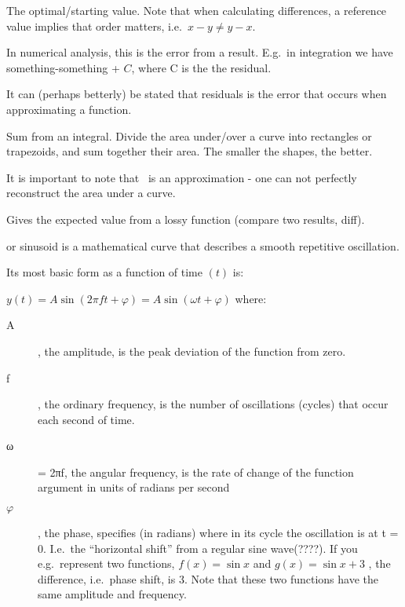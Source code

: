 \begin{definition}[Flow]
\begin{definition}
    The optimal/starting value. Note that when calculating differences,
    a reference value implies that order matters, i.e.\ $x - y \neq y - x$.

\end{definition}

\begin{definition}[Residual]
    In numerical analysis, this is the error from a result.
    E.g.\ in integration we have something-something + $C$, where C is the 
    the residual.

    It can (perhaps betterly) be stated that residuals is the error that occurs
    when approximating a function.

\end{definition}

\begin{definition}\label{riemannsum}
    Sum from an integral. Divide the area under/over a curve into rectangles
    or trapezoids, and sum together their area. The smaller the shapes, the
    better.

    It is important to note that~ is an approximation - 
    one can not perfectly reconstruct the area under a curve.
\end{definition}

\begin{definition}
    Gives the expected value from a lossy function (compare two results, diff).
\end{definition}

\begin{definition}
or sinusoid is a mathematical curve that describes a smooth repetitive
oscillation.

Its most basic form as a function of time $(t)$ is:

$y(t) = A\sin(2 \pi f t + \varphi) = A\sin(\omega t + \varphi)$
where:
\begin{description}
    \item[A], the amplitude, is the peak deviation of the function from zero.
    \item[f], the ordinary frequency, is the number of oscillations (cycles)
        that occur each second of time.
    \item[ω] = 2πf, the angular frequency, is the rate of change of the
    function argument in units of radians per second 
    \item[$\varphi$], the phase, specifies (in radians) where in its cycle the
        oscillation is at t = 0. I.e.\ the ``horizontal shift'' from a regular
        sine wave(????).
    If you e.g.\ represent two functions, $f(x) = \sin{x}$ and $g(x) = \sin{x} + 3$
    , the difference, i.e.\ phase shift, is 3. Note that these two functions
    have the same amplitude and frequency.
\end{description}


\end{definition}
\end{definition}
